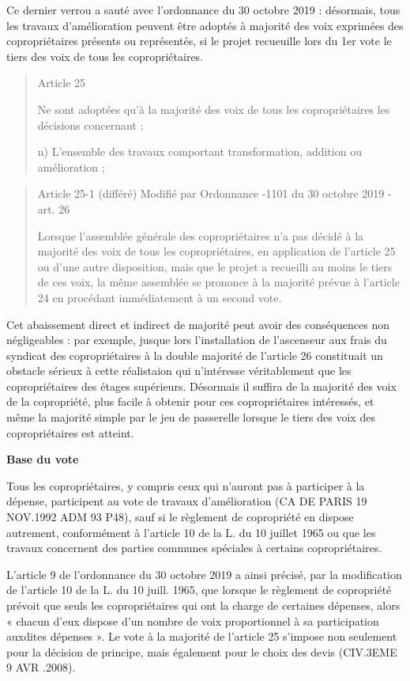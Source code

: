 				Ce dernier verrou a sauté avec l’ordonnance du 30 octobre 2019 : désormais, tous les travaux d’amélioration peuvent être adoptés à majorité des voix exprimées des copropriétaires présents ou représentés, si le projet recueuille lors du 1er vote le tiers des voix de tous les copropriétaires.
				
				\begin{quote}
					Article 25
	
					Ne sont adoptées qu'à la majorité des voix de tous les copropriétaires les décisions concernant :
					
					n) L'ensemble des travaux comportant transformation, addition ou amélioration ;
				\end{quote}
				\begin{quote}
					Article 25-1 (différé) Modifié par Ordonnance -1101 du 30 octobre 2019 - art. 26
					
					Lorsque l'assemblée générale des copropriétaires n'a pas décidé à la majorité des voix de tous les copropriétaires, en application de l'article 25 ou d'une autre disposition, mais que le projet a recueilli au moins le tiers de ces voix, la même assemblée se prononce à la majorité prévue à l'article 24 en procédant immédiatement à un second vote.
				\end{quote}
				
				Cet abaissement direct et indirect de majorité peut avoir des conséquences non négligeables : par exemple, jusque lors l’installation de l’ascenseur aux frais du syndicat des copropriétaires à la double majorité de l’article 26 constituait un obstacle sérieux à cette réalistaion qui n’intéresse véritablement que les copropriétaires des étages supérieurs. Désormais il suffira de la majorité des voix de la copropriété, plus facile à obtenir pour ces copropriétaires intéressés, et même la majorité simple par le jeu de passerelle lorsque le tiers des voix des copropriétaires est atteint.
				
				\textbf{Base du vote}
				
				Tous les copropriétaires, y compris ceux qui n’auront pas à participer à la dépense, participent au vote de travaux d’amélioration (CA DE PARIS 19 NOV.1992 ADM 93 P48), sauf si le règlement de copropriété en dispose autrement, conformément à l’article 10 de la L. du 10 juillet 1965 ou que les travaux concernent des parties communes spéciales à certains copropriétaires.
				
				L’article 9 de l'ordonnance du 30 octobre 2019 a ainsi précisé, par la modification de l’article 10 de la L. du 10 juill. 1965, que lorsque le règlement de copropriété prévoit que seuls les copropriétaires qui ont la charge de certaines dépenses, alors « chacun d’eux dispose d’un nombre de voix proportionnel à sa participation auxdites dépenses ».
				Le vote à la majorité de l’article 25 s’impose non seulement pour la décision de principe, mais également pour le choix des devis (CIV.3EME 9 AVR .2008).
			
